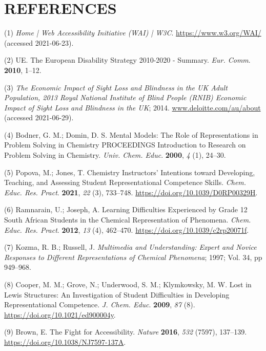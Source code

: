 \documentclass[11.5pt]{sig-alternate} %
\begin{document}
\section*{REFERENCES}\par 

\leftskip 0.25in
\parindent -0.25in %

(1)	\textit{Home | Web Accessibility Initiative (WAI) | W3C}. \url{https://www.w3.org/WAI/} (accessed 2021-06-23).

(2)	UE. The European Disability Strategy 2010-2020 - Summary. \textit{Eur. Comm}. \textbf{2010}, 1–12.

(3)	\textit{The Economic Impact of Sight Loss and Blindness in the UK Adult Population, 2013 Royal National Institute of Blind People (RNIB) Economic Impact of Sight Loss and Blindness in the UK}; 2014. \url{www.deloitte.com/au/about} (accessed 2021-06-29).

(4)	Bodner, G. M.; Domin, D. S. Mental Models: The Role of Representations in Problem Solving in Chemistry PROCEEDINGS Introduction to Research on Problem Solving in Chemistry. \textit{Univ. Chem. Educ}. \textbf{2000}, \textit{4} (1), 24–30.

(5)	Popova, M.; Jones, T. Chemistry Instructors’ Intentions toward Developing, Teaching, and Assessing Student Representational Competence Skills. \textit{Chem. Educ. Res. Pract}. \textbf{2021}, \textit{22} (3), 733–748. \url{https://doi.org/10.1039/D0RP00329H}.

(6)	Ramnarain, U.; Joseph, A. Learning Difficulties Experienced by Grade 12 South African Students in the Chemical Representation of Phenomena. \textit{Chem. Educ. Res. Pract}. \textbf{2012}, \textit{13} (4), 462–470. \url{https://doi.org/10.1039/c2rp20071f}.

(7)	Kozma, R. B.; Russell, J. \textit{Multimedia and Understanding: Expert and Novice Responses to Different Representations of Chemical Phenomena}; 1997; Vol. 34, pp 949–968.

(8)	Cooper, M. M.; Grove, N.; Underwood, S. M.; Klymkowsky, M. W. Lost in Lewis Structures: An Investigation of Student Difficulties in Developing Representational Competence. \textit{J. Chem. Educ}. \textbf{2009}, \textit{87} (8). \url{https://doi.org/10.1021/ed900004y}.

(9)	Brown, E. The Fight for Accessibility. \textit{Nature} \textbf{2016}, \textit{532} (7597), 137–139. \url{https://doi.org/10.1038/NJ7597-137A}.
\end{document}
